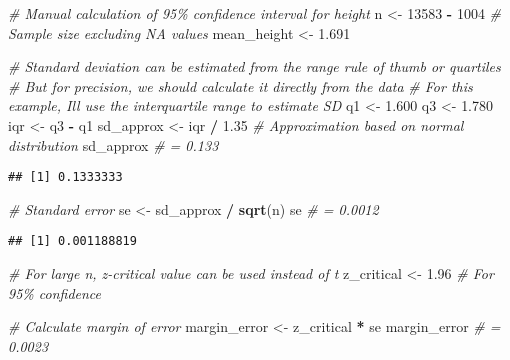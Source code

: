 \documentclass[
]{article}
\newenvironment{Shaded}{\begin{snugshade}}{\end{snugshade}}
\newcommand{\CommentTok}[1]{\textcolor[rgb]{0.56,0.35,0.01}{\textit{#1}}}
\newcommand{\DecValTok}[1]{\textcolor[rgb]{0.00,0.00,0.81}{#1}}
\newcommand{\FloatTok}[1]{\textcolor[rgb]{0.00,0.00,0.81}{#1}}
\newcommand{\FunctionTok}[1]{\textcolor[rgb]{0.13,0.29,0.53}{\textbf{#1}}}
\newcommand{\NormalTok}[1]{#1}
\newcommand{\OtherTok}[1]{\textcolor[rgb]{0.56,0.35,0.01}{#1}}
\newcommand{\SpecialCharTok}[1]{\textcolor[rgb]{0.81,0.36,0.00}{\textbf{#1}}}
\begin{document}
\begin{Shaded}
\begin{Highlighting}[]
\CommentTok{\# Manual calculation of 95\% confidence interval for height}
\NormalTok{n }\OtherTok{\textless{}{-}} \DecValTok{13583} \SpecialCharTok{{-}} \DecValTok{1004}  \CommentTok{\# Sample size excluding NA values}
\NormalTok{mean\_height }\OtherTok{\textless{}{-}} \FloatTok{1.691}

\CommentTok{\# Standard deviation can be estimated from the range rule of thumb or quartiles}
\CommentTok{\# But for precision, we should calculate it directly from the data}
\CommentTok{\# For this example, I\textquotesingle{}ll use the interquartile range to estimate SD}
\NormalTok{q1 }\OtherTok{\textless{}{-}} \FloatTok{1.600}
\NormalTok{q3 }\OtherTok{\textless{}{-}} \FloatTok{1.780}
\NormalTok{iqr }\OtherTok{\textless{}{-}}\NormalTok{ q3 }\SpecialCharTok{{-}}\NormalTok{ q1}
\NormalTok{sd\_approx }\OtherTok{\textless{}{-}}\NormalTok{ iqr }\SpecialCharTok{/} \FloatTok{1.35}  \CommentTok{\# Approximation based on normal distribution}
\NormalTok{sd\_approx  }\CommentTok{\# = 0.133}
\end{Highlighting}
\end{Shaded}

\begin{verbatim}
## [1] 0.1333333
\end{verbatim}

\begin{Shaded}
\begin{Highlighting}[]
\CommentTok{\# Standard error}
\NormalTok{se }\OtherTok{\textless{}{-}}\NormalTok{ sd\_approx }\SpecialCharTok{/} \FunctionTok{sqrt}\NormalTok{(n)}
\NormalTok{se  }\CommentTok{\# = 0.0012}
\end{Highlighting}
\end{Shaded}

\begin{verbatim}
## [1] 0.001188819
\end{verbatim}

\begin{Shaded}
\begin{Highlighting}[]
\CommentTok{\# For large n, z{-}critical value can be used instead of t}
\NormalTok{z\_critical }\OtherTok{\textless{}{-}} \FloatTok{1.96}  \CommentTok{\# For 95\% confidence}

\CommentTok{\# Calculate margin of error}
\NormalTok{margin\_error }\OtherTok{\textless{}{-}}\NormalTok{ z\_critical }\SpecialCharTok{*}\NormalTok{ se}
\NormalTok{margin\_error  }\CommentTok{\# = 0.0023}
\end{Highlighting}
\end{Shaded}
\end{document}
